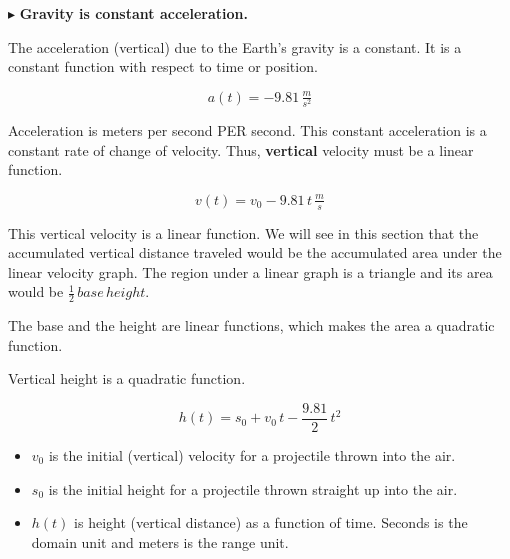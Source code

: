 \documentclass{ximera}
\begin{document}
$\blacktriangleright$ \textbf{\textcolor{blue!55!black}{Gravity is constant acceleration.}}  

The acceleration (vertical) due to the Earth's gravity is a constant.  It is a constant function with respect to time or position.


\[ a(t) = -9.81 \, \tfrac{m}{s^2}  \]



Acceleration is meters per second PER second.  This constant acceleration is a constant rate of change of velocity.  Thus, \textbf{vertical} velocity must be a linear function.




\[ v(t) = v_0 - 9.81 \, t  \, \tfrac{m}{s}\]



This vertical velocity is a linear function. We will see in this section that the accumulated vertical distance traveled would be the accumulated area under the linear velocity graph. The region under a linear graph is a triangle and its area would be $\frac{1}{2} \, base \, height.$

The base and the height are linear functions, which makes the area a quadratic function.

Vertical height is a quadratic function.



\[ h(t) = s_0 + v_0 \, t - \frac{9.81}{2} \, t^2  \]




\begin{itemize}
\item $v_0$ is the initial (vertical) velocity for a projectile thrown into the air. 

\item $s_0$ is the initial height for a projectile thrown straight up into the air. 

\item $h(t)$ is height (vertical distance) as a function of time.  Seconds is the domain unit and meters is the range unit.
\end{itemize}
\end{document}

